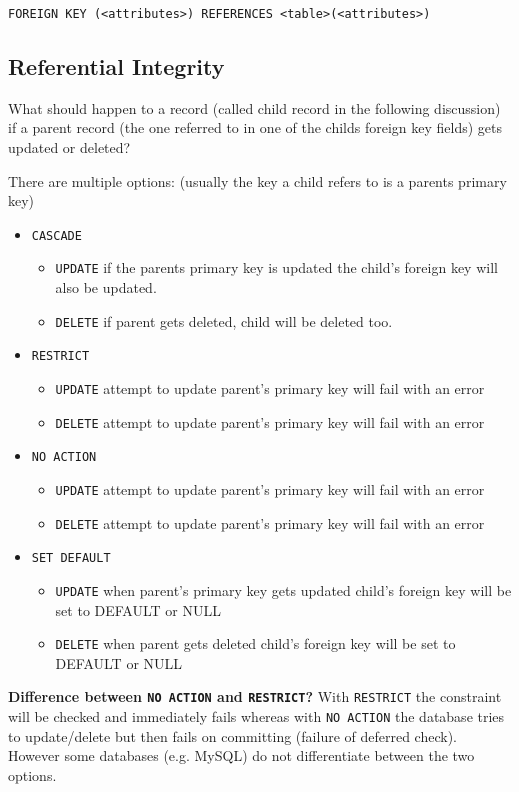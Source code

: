 \documentclass{sciposter}
\renewcommand{\t}[1]{\texttt{#1}}
\begin{document}
\begin{multicols}{3}
\t{FOREIGN KEY (<attributes>) REFERENCES <table>(<attributes>)}

\subsection*{Referential Integrity}

What should happen to a record (called child record in the following discussion) if a parent record (the one referred to in one of the childs foreign key fields) gets updated or deleted?

There are multiple options: (usually the key a child refers to is a parents primary key)

\begin{itemize}
	\item \t{CASCADE}
	\begin{itemize} 
		\item \t{UPDATE} if the parents primary key is updated the child's foreign key will also be updated.
		\item \t{DELETE} if parent gets deleted, child will be deleted too.
	\end{itemize}
	\item \t{RESTRICT}
	\begin{itemize} 
		\item \t{UPDATE} attempt to update parent's primary key will fail with an error
		\item \t{DELETE} attempt to update parent's primary key will fail with an error
	\end{itemize}
	\item \t{NO ACTION}
	\begin{itemize} 
		\item \t{UPDATE} attempt to update parent's primary key will fail with an error
		\item \t{DELETE} attempt to update parent's primary key will fail with an error
	\end{itemize}
	\item \t{SET DEFAULT}
	\begin{itemize} 
		\item \t{UPDATE} when parent's primary key gets updated child's foreign key will be set to DEFAULT or NULL
		\item \t{DELETE} when parent gets deleted child's foreign key will be set to DEFAULT or NULL
	\end{itemize}
\end{itemize}

\textbf{Difference between \t{NO ACTION} and \t{RESTRICT}?} With \t{RESTRICT} the constraint will be checked and immediately fails whereas with \t{NO ACTION} the database tries to update/delete but then fails on committing (failure of deferred check). However some databases (e.g. MySQL) do not differentiate between the two options.


\end{multicols}
\end{document}
